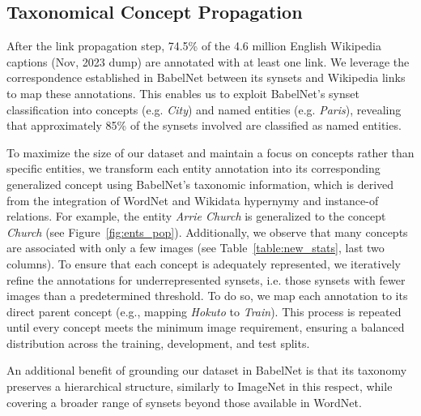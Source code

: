 \documentclass[11pt]{article}
\begin{document}
\subsection{Taxonomical Concept Propagation}
\label{subsec:conc_pop}
After the link propagation step, 74.5\% of the 4.6 million English Wikipedia captions (Nov, 2023 dump) are annotated with at least one link. 
We leverage the correspondence established in BabelNet between its synsets and Wikipedia links to map these annotations. This enables us to exploit BabelNet's synset classification into concepts (e.g. \textit{City}) and named entities (e.g. \textit{Paris}), revealing that approximately 85\% of the synsets involved are classified as named entities.

To maximize the size of our dataset and maintain a focus on concepts rather than specific entities, we transform each entity annotation into its corresponding generalized concept using BabelNet's taxonomic information, which is derived from the integration of WordNet and Wikidata hypernymy and instance-of relations. For example, the entity \textit{Arrie Church} is generalized to the concept \textit{Church} (see Figure~\ref{fig:ents_pop}). 
Additionally, we observe that many concepts are associated with only a few images (see Table~\ref{table:new_stats}, last two columns). To ensure that each concept is adequately represented, we iteratively refine the annotations for underrepresented synsets, i.e. those synsets with fewer images than a predetermined threshold. To do so, we map each annotation to its direct parent concept (e.g., mapping \textit{Hokuto} to \textit{Train}). 
This process is repeated until every concept meets the minimum image requirement, ensuring a balanced distribution across the training, development, and test splits.

An additional benefit of grounding our dataset in BabelNet is that its taxonomy preserves a hierarchical structure, similarly to ImageNet in this respect, while covering a broader range of synsets beyond those available in WordNet.
\end{document}
